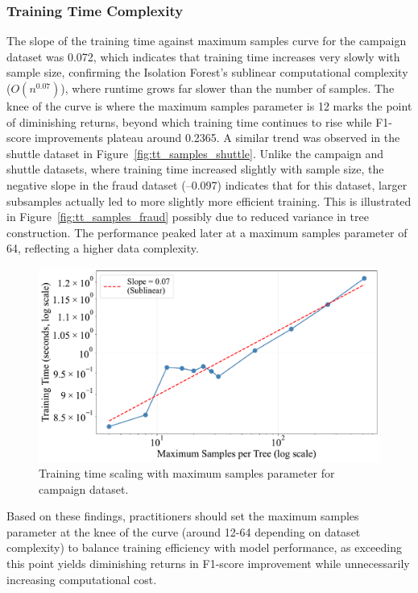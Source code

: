 \documentclass[10pt, conference]{IEEEtran}
\begin{document}
\subsubsection{Training Time Complexity}
The slope of the training time against maximum samples curve for the campaign dataset was 0.072, which indicates that training time increases very slowly with sample size, confirming the Isolation Forest’s sublinear computational complexity ($O(n^{0.07})$), where runtime grows far slower than the number of samples. The knee of the curve is where the maximum samples parameter is 12 marks the point of diminishing returns, beyond which training time continues to rise while F1-score improvements plateau around 0.2365. A similar trend was observed in the shuttle dataset in Figure~\ref{fig:tt_samples_shuttle}. Unlike the campaign and shuttle datasets, where training time increased slightly with sample size, the negative slope in the fraud dataset (–0.097) indicates that for this dataset, larger subsamples actually led to more slightly more efficient training. This is illustrated in Figure~\ref{fig:tt_samples_fraud} possibly due to reduced variance in tree construction. The performance peaked later at a maximum samples parameter of 64, reflecting a higher data complexity.
 
\begin{figure}[H]
	\centering
	\includegraphics[width=0.95\linewidth]{../results/campaign/max_samples/training_time_scaling.pdf}
	\caption{Training time scaling with maximum samples parameter for campaign dataset.}
	\label{fig:tt_samples_campaign}
\end{figure}

Based on these findings, practitioners should set the maximum samples parameter at the knee of the curve (around 12-64 depending on dataset complexity) to balance training efficiency with model performance, as exceeding this point yields diminishing returns in F1-score improvement while unnecessarily increasing computational cost.
\end{document}
